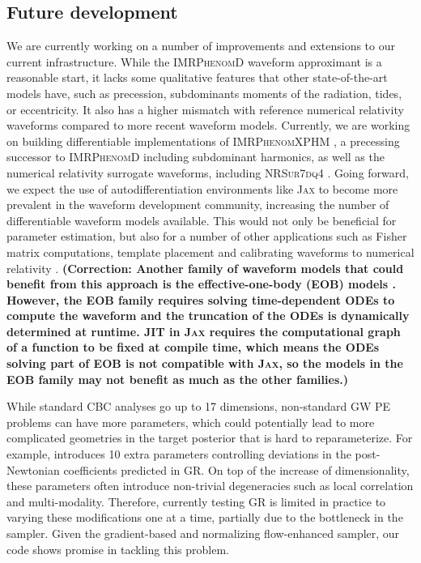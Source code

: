 \documentclass[twocolumn]{aastex631}
\newcommand{\corr}[1]{\textbf{\color{pyRed}(Correction: #1)}}
\begin{document}
\subsection{Future development}

We are currently working on a number of improvements and extensions to our
current infrastructure. While the \textsc{IMRPhenomD} waveform approximant is a
reasonable start, it lacks some qualitative features that other state-of-the-art
models have, such as precession, subdominants moments of the radiation, tides,
or eccentricity. It also has a higher mismatch with reference numerical
relativity waveforms compared to more recent waveform models. Currently, we are
working on building differentiable implementations of \textsc{IMRPhenomXPHM}
\citep{Pratten:2020ceb}, a precessing successor to \textsc{IMRPhenomD} including
subdominant harmonics, as well as the numerical relativity surrogate waveforms,
including \textsc{NRSur7dq4} \citep{Varma:2018mmi}. Going forward, we expect the
use of autodifferentiation environments like \textsc{Jax} to become more
prevalent in the waveform development community, increasing the number of
differentiable waveform models available. This would not only be beneficial for
parameter estimation, but also for a number of other applications such as Fisher
matrix computations, template placement and calibrating waveforms to numerical
relativity
\citep{Coogan:2022qxs,Iacovelli:2022bbs,Iacovelli:2022mbg,Edwards:2023sak}.
\corr{Another family of waveform models that could benefit from this approach is
the effective-one-body (EOB) models \citep{Buonanno:1998gg,PhysRevD.89.061502}.
However, the EOB family requires solving time-dependent ODEs to compute the
waveform and the truncation of the ODEs is dynamically determined at runtime.
JIT in \textsc{Jax} requires the computational graph of a function to be fixed
at compile time, which means the ODEs solving part of EOB is not compatible with
\textsc{Jax}, so the models in the EOB family may not benefit as much as the
other families.}


While standard CBC analyses go up to 17 dimensions, non-standard GW PE problems
can have more parameters, which could potentially lead to more complicated
geometries in the target posterior that is hard to reparameterize. For example,
\cite{LIGOScientific:2021sio} introduces 10 extra parameters controlling
deviations in the post-Newtonian coefficients predicted in GR. On top of the
increase of dimensionality, these parameters often introduce non-trivial
degeneracies such as local correlation and multi-modality. Therefore, currently
testing GR is limited in practice to varying these modifications one at a time,
partially due to the bottleneck in the sampler.  Given the gradient-based and
normalizing flow-enhanced sampler, our code shows promise in tackling this
problem.
\end{document}
